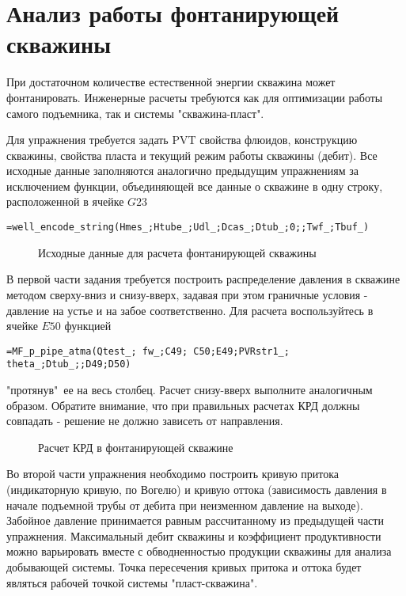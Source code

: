 \section{Анализ работы фонтанирующей скважины}

При достаточном количестве естественной энергии скважина может фонтанировать. Инженерные расчеты требуются как для оптимизации работы самого подъемника, так и системы "скважина-пласт".

Для упражнения требуется задать PVT свойства флюидов, конструкцию скважины, свойства пласта и текущий режим работы скважины (дебит). Все исходные данные заполняются аналогично предыдущим упражнениям за исключением функции, объединяющей все данные о скважине в одну строку, расположенной в ячейке  $G23$

{ \small  \texttt{=well\_encode\_string(Hmes\_;Htube\_;Udl\_;Dcas\_;Dtub\_;0;;Twf\_;Tbuf\_)
}}

\begin{figure}[h!]
	\center{\texttt{[image: Ex90\_1]}}
	\caption{Исходные данные для расчета фонтанирующей скважины}
	\label{ris:Ex90_1}
\end{figure}

В первой части задания требуется построить распределение давления в скважине методом сверху-вниз и снизу-вверх, задавая при этом граничные условия - давление на устье и на забое соответственно. Для расчета воспользуйтесь в ячейке $E50$ функцией

{ \small  \texttt{=MF\_p\_pipe\_atma(Qtest\_; fw\_;C49; C50;E49;PVRstr1\_; theta\_;Dtub\_;;D49;D50)
}}

"протянув"\ ее на весь столбец. Расчет снизу-вверх выполните аналогичным образом. Обратите внимание, что при правильных расчетах КРД должны совпадать - решение не должно зависеть от направления.

\begin{figure}[h!]
	\center{\texttt{[image: Ex90\_2]}}
	\caption{Расчет КРД в фонтанирующей скважине}
	\label{ris:Ex90_2}
\end{figure}

Во второй части упражнения необходимо построить кривую притока (индикаторную кривую, по Вогелю) и кривую оттока (зависимость давления в начале подъемной трубы от дебита при неизменном давление на выходе). Забойное давление принимается равным рассчитанному из предыдущей части упражнения. Максимальный дебит скважины и коэффициент продуктивности можно варьировать вместе с обводненностью продукции скважины для анализа добывающей системы. Точка пересечения кривых притока и оттока будет являться рабочей точкой системы "пласт-скважина".

